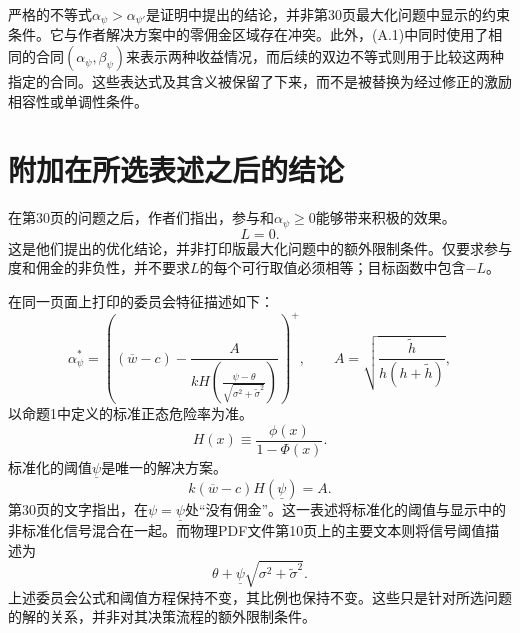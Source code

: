 \documentclass{article}
\begin{document}
严格的不等式\(\alpha_\psi>\alpha_{\psi'}\)是证明中提出的结论，并非第30页最大化问题中显示的约束条件。它与作者解决方案中的零佣金区域存在冲突。此外，(A.1)中同时使用了相同的合同\((\alpha_\psi,\beta_\psi)\)来表示两种收益情况，而后续的双边不等式则用于比较这两种指定的合同。这些表达式及其含义被保留了下来，而不是被替换为经过修正的激励相容性或单调性条件。

\section*{附加在所选表述之后的结论}

在第30页的问题之后，作者们指出，参与和\(\alpha_\psi\geq0\)能够带来积极的效果。
\[
L=0.
\]
这是他们提出的优化结论，并非打印版最大化问题中的额外限制条件。仅要求参与度和佣金的非负性，并不要求\(L\)的每个可行取值必须相等；目标函数中包含\(-L\)。

在同一页面上打印的委员会特征描述如下：
\[
\alpha_\psi^*
=\left(
(\overline w-c)
-\frac{A}{kH\left(\frac{\psi-\theta}{\sqrt{\sigma^2+\widetilde\sigma^2}}\right)}
\right)^+,
\qquad
A=\sqrt{\frac{\widetilde h}{h(h+\widetilde h)}},
\]
以命题1中定义的标准正态危险率为准。
\[
H(x)\equiv\frac{\phi(x)}{1-\Phi(x)}.
\]
标准化的阈值\(\underline\psi\)是唯一的解决方案。
\[
k(\overline w-c)H(\underline\psi)=A.
\]
第30页的文字指出，在\(\psi=\underline\psi\)处“没有佣金”。这一表述将标准化的阈值与显示中的非标准化信号混合在一起。而物理PDF文件第10页上的主要文本则将信号阈值描述为
\[
\theta+\underline\psi\sqrt{\sigma^2+\widetilde\sigma^2}.
\]
上述委员会公式和阈值方程保持不变，其比例也保持不变。这些只是针对所选问题的解的关系，并非对其决策流程的额外限制条件。
\end{document}

